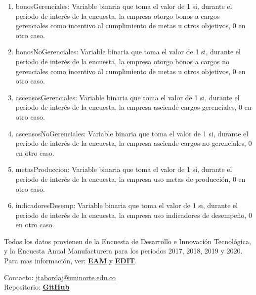 \documentclass[12pt,a4paper]{article}
\begin{document}
\begin{enumerate}
	\item bonosGerenciales: Variable binaria que toma el valor de 1 si, durante el periodo de interés de la encuesta, la empresa otorgo bonos a cargos gerenciales como incentivo al cumplimiento de metas u otros objetivos, 0 en otro caso.
	\item bonosNoGerenciales: Variable binaria que toma el valor de 1 si, durante el periodo de interés de la encuesta, la empresa otorgo bonos a cargos no gerenciales como incentivo al cumplimiento de metas u otros objetivos, 0 en otro caso.
	\item ascensosGerenciales: Variable binaria que toma el valor de 1 si, durante el periodo de interés de la encuesta, la empresa asciende cargos gerenciales, 0 en otro caso.
	\item ascensosNoGerenciales: Variable binaria que toma el valor de 1 si, durante el periodo de interés de la encuesta, la empresa asciende cargos no gerenciales, 0 en otro caso.
	\item metasProduccion: Variable binaria que toma el valor de 1 si, durante el periodo de interés de la encuesta, la empresa uso metas de producción, 0 en otro caso.
	\item indicadoresDesemp: Variable binaria que toma el valor de 1 si, durante el periodo de interés de la encuesta, la empresa uso indicadores de desempeño, 0 en otro caso.
\end{enumerate}


Todos los datos provienen de la Encuesta de Desarrollo e Innovación Tecnológica, y la Encuesta Anual Manufacturera para los periodos 2017, 2018, 2019 y 2020. Para mas información, ver: \textbf{\href{https://www.dane.gov.co/index.php/estadisticas-por-tema/industria/encuesta-anual-manufacturera-enam}{EAM}} y  \textbf{\href{https://www.dane.gov.co/index.php/estadisticas-por-tema/tecnologia-e-innovacion/encuesta-de-desarrollo-e-innovacion-tecnologica-edit}{EDIT}}.

\vfill

\noindent Contacto: \href{mailto:jtabordaj@uninorte.edu.co}{jtabordaj@uninorte.edu.co} \\
Repositorio: \textbf{\href{https://github.com/jtabordaj/research_perilla}{GitHub}}
\end{document}
